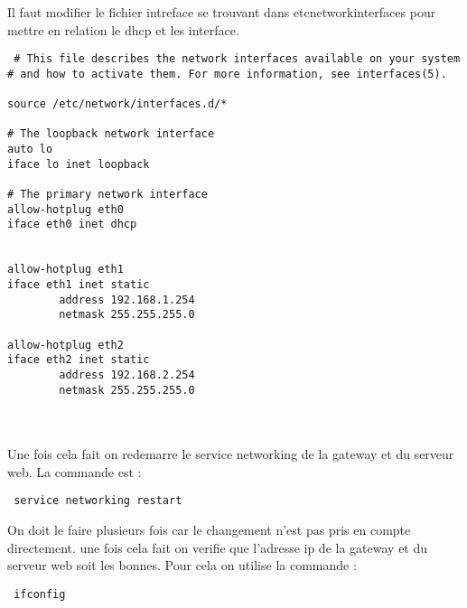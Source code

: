 \documentclass[a4paper,12pt]{article}
\begin{document}
Il faut modifier le fichier intreface se trouvant dans \/etc\/network\/interfaces pour mettre en relation le dhcp et les interface.
\begin{verbatim}
 # This file describes the network interfaces available on your system
# and how to activate them. For more information, see interfaces(5).

source /etc/network/interfaces.d/*

# The loopback network interface
auto lo
iface lo inet loopback

# The primary network interface
allow-hotplug eth0
iface eth0 inet dhcp


allow-hotplug eth1
iface eth1 inet static
        address 192.168.1.254
        netmask 255.255.255.0

allow-hotplug eth2
iface eth2 inet static
        address 192.168.2.254
        netmask 255.255.255.0
        
        
\end{verbatim}

\paragraph{}
Une fois cela fait on redemarre le service networking  de la gateway et du serveur web.
La commande est :
\begin{verbatim}
 service networking restart 
\end{verbatim}

On doit le faire plusieurs fois car le changement n'est pas pris en compte directement. 
une fois cela fait on verifie que l'adresse ip de la gateway et du serveur web soit les bonnes.
Pour cela on utilise la commande :
\begin{verbatim}
 ifconfig
\end{verbatim}
\end{document}
